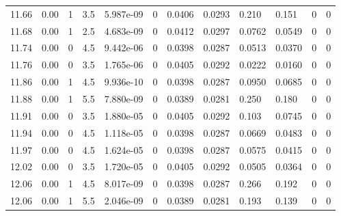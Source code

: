 \documentclass[preview]{standalone}
\begin{document}
{{{{{{{{\begin{tabular}{L{1.2cm}C{1.2cm} C{0.3cm}C{0.5cm} C{1.4cm}C{1.4cm} C{1.4cm}C{1.4cm} C{1.6cm}C{1.6cm} C{1.6cm}C{1.6cm}}
  11.66  &  0.00  & 1     & 3.5 &  5.987e-09  & 0  &  0.0406&   0.0293& 0.210 & 0.151   &  0 & 0  \\ 
  11.68  &  0.00  & 1     & 2.5 &  4.683e-09  & 0  &  0.0412&   0.0297& 0.0762 & 0.0549   &  0 & 0  \\ 
  11.74  &  0.00  & 0     & 4.5 &  9.442e-06  & 0  &  0.0398&   0.0287& 0.0513 & 0.0370   &  0 & 0  \\ 
  11.76  &  0.00  & 0     & 3.5 &  1.765e-06  & 0  &  0.0405&   0.0292& 0.0222 & 0.0160   &  0 & 0  \\ 
  11.86  &  0.00  & 1     & 4.5 &  9.936e-10  & 0  &  0.0398&   0.0287& 0.0950 & 0.0685   &  0 & 0  \\ 
  11.88  &  0.00  & 1     & 5.5 &  7.880e-09  & 0  &  0.0389&   0.0281& 0.250 & 0.180   &  0 & 0  \\ 
  11.91  &  0.00  & 0     & 3.5 &  1.880e-05  & 0  &  0.0405&   0.0292& 0.103 & 0.0745   &  0 & 0  \\ 
  11.94  &  0.00  & 0     & 4.5 &  1.118e-05  & 0  &  0.0398&   0.0287& 0.0669 & 0.0483   &  0 & 0  \\ 
  11.97  &  0.00  & 0     & 4.5 &  1.624e-05  & 0  &  0.0398&   0.0287& 0.0575 & 0.0415   &  0 & 0  \\ 
  12.02  &  0.00  & 0     & 3.5 &  1.720e-05  & 0  &  0.0405&   0.0292& 0.0505 & 0.0364   &  0 & 0  \\ 
  12.06  &  0.00  & 1     & 4.5 &  8.017e-09  & 0  &  0.0398&   0.0287& 0.266 & 0.192   &  0 & 0  \\ 
  12.06  &  0.00  & 1     & 5.5 &  2.046e-09  & 0  &  0.0389&   0.0281& 0.193 & 0.139   &  0 & 0  \\ 
\hline 
\end{tabular} 

}}}}}}}}
\end{document}
